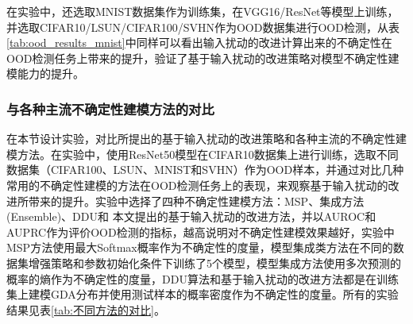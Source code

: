 在实验中，还选取MNIST数据集作为训练集，在VGG16/ResNet等模型上训练，并选取CIFAR10/LSUN/CIFAR100/SVHN作为OOD数据集进行OOD检测，从表\ref{tab:ood_results_mnist}中同样可以看出输入扰动的改进计算出来的不确定性在OOD检测任务上带来的提升，验证了基于输入扰动的改进策略对模型不确定性建模能力的提升。
\begin{table}[h]
    \captionsetup{font=small, justification=centering}
    \centering
    \renewcommand{\arraystretch}{1.0} %
    \caption{在MNIST上训练不同的模型(VGG16,ResNet50)，选取SVHN、LSUN、CIFAR100、CIFAR10作为OOD样本，对比DDU算法和基于输入扰动的改进对模型不确定性的建模效果，报告指标是AUROC($\uparrow$) / AUPRC($\uparrow$)}
    \label{tab:ood_results_mnist}
\end{table}



\subsubsection{与各种主流不确定性建模方法的对比}
在本节设计实验，对比所提出的基于输入扰动的改进策略和各种主流的不确定性建模方法。在实验中，使用ResNet50模型在CIFAR10数据集上进行训练，选取不同数据集（CIFAR100、LSUN、MNIST和SVHN）作为OOD样本，并通过对比几种常用的不确定性建模的方法在OOD检测任务上的表现，来观察基于输入扰动的改进所带来的提升。实验中选择了四种不确定性建模方法：MSP、集成方法(Ensemble)、DDU和 本文提出的基于输入扰动的改进方法，并以AUROC和AUPRC作为评价OOD检测的指标，越高说明对不确定性建模效果越好，实验中MSP方法使用最大Softmax概率作为不确定性的度量，模型集成类方法在不同的数据集增强策略和参数初始化条件下训练了5个模型，模型集成方法使用多次预测的概率的熵作为不确定性的度量，DDU算法和基于输入扰动的改进方法都是在训练集上建模GDA分布并使用测试样本的概率密度作为不确定性的度量。所有的实验结果见表\ref{tab:不同方法的对比}。


